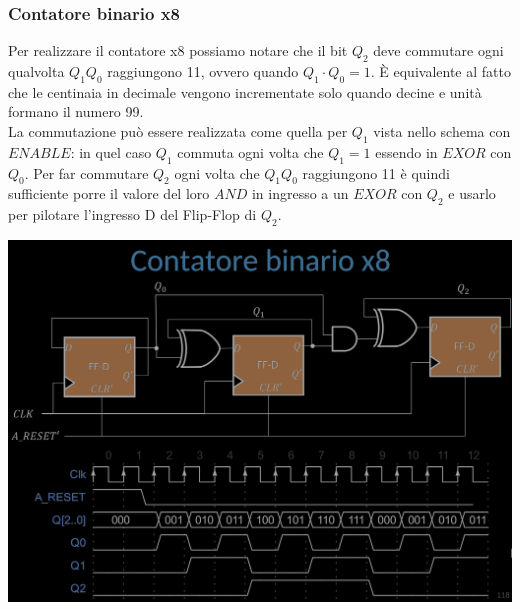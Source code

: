 \documentclass{article}
\begin{document}
\subsubsection{Contatore binario x8}
Per realizzare il contatore x8 possiamo notare che il bit $Q_2$ deve commutare ogni qualvolta $Q_1Q_0$ raggiungono 11, ovvero quando $Q_1 \cdot Q_0=1$. È equivalente al fatto che le centinaia in decimale vengono incrementate solo quando decine e unità formano il numero 99.\\ 
La commutazione può essere realizzata come quella per $Q_1$ vista nello schema con $ENABLE$: in quel caso $Q_1$ commuta ogni volta che $Q_1 =1$ essendo in $EXOR$ con $Q_0$. Per far commutare $Q_2$ ogni volta che $Q_1Q_0$ raggiungono 11 è quindi sufficiente porre il valore del loro $AND$ in ingresso a un $EXOR$ con $Q_2$ e usarlo per pilotare l'ingresso D del Flip-Flop di $Q_2$.
\begin{center}
    \includegraphics[scale=0.35]{contatore x8.png}
\end{center}
\end{document}
